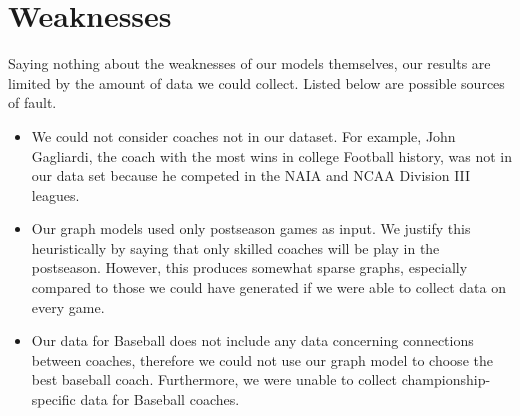 \documentclass[12pt]{article}
\begin{document}
\section{Weaknesses}
Saying nothing about the weaknesses of our models themselves, our results are limited by the amount of data we could collect. Listed below are possible sources of fault.
\begin{itemize}
\item We could not consider coaches not in our dataset. For example, John Gagliardi, the coach with the most wins in college Football history, was not in our data set because he competed in the NAIA and NCAA Division III leagues. 

\item Our graph models used only postseason games as input. We justify this heuristically by saying that only skilled coaches will be play in the postseason. However, this produces somewhat sparse graphs, especially compared to those we could have generated if we were able to collect data on every game.

\item Our data for Baseball does not include any data concerning connections between coaches, therefore we could not use our graph model to choose the best baseball coach. Furthermore, we were unable to collect championship-specific data for Baseball coaches.
\end{itemize}
\end{document}

